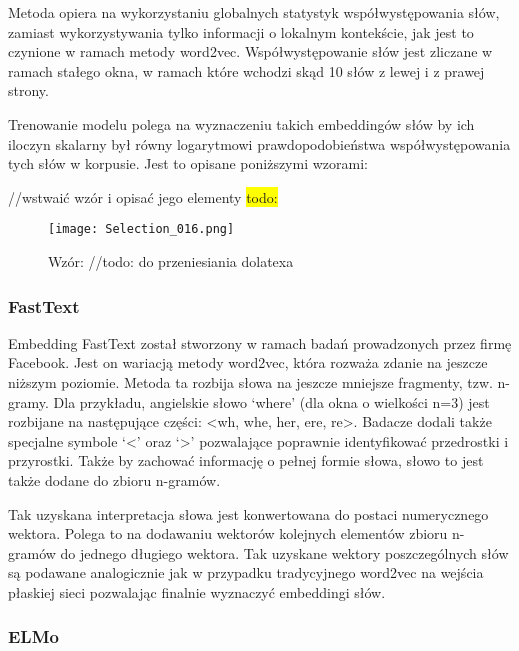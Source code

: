 Metoda opiera na wykorzystaniu globalnych statystyk współwystępowania słów, zamiast wykorzystywania tylko informacji o lokalnym kontekście, jak jest to czynione w ramach metody word2vec. Współwystępowanie słów jest zliczane w ramach stałego okna, w ramach które wchodzi skąd 10 słów z lewej i z prawej strony. 

Trenowanie modelu polega na wyznaczeniu takich embeddingów słów by ich iloczyn skalarny był równy logarytmowi prawdopodobieństwa współwystępowania tych słów w korpusie. Jest to opisane poniższymi wzorami: 

//wstwaić wzór i opisać jego elementy 
\colorbox{yellow}{todo:}\\

\begin{figure}[!h]
    \label{fig:wzor}
    \centering \texttt{[image: Selection\_016.png]}
    \caption{Wzór: //todo: do przeniesiania dolatexa}
\end{figure}

\subsubsection{FastText}

Embedding FastText został stworzony w ramach badań prowadzonych przez firmę Facebook. Jest on wariacją metody word2vec, która rozważa zdanie na jeszcze niższym poziomie. Metoda ta rozbija słowa na jeszcze mniejsze fragmenty, tzw. n-gramy. Dla przykładu, angielskie słowo ‘where’ (dla okna o wielkości n=3) jest rozbijane na następujące części: <wh, whe, her, ere, re>. Badacze dodali także specjalne symbole ‘<’ oraz ‘>’ pozwalające poprawnie identyfikować przedrostki i przyrostki. Także by zachować informację o pełnej formie słowa, słowo to jest także dodane do zbioru n-gramów. 

Tak uzyskana interpretacja słowa jest konwertowana do postaci numerycznego wektora. Polega to na dodawaniu wektorów kolejnych elementów zbioru n-gramów do jednego długiego wektora. Tak uzyskane wektory poszczególnych słów są podawane analogicznie jak w przypadku tradycyjnego word2vec na wejścia płaskiej sieci pozwalając finalnie wyznaczyć embeddingi słów. 


\subsubsection{ELMo}

